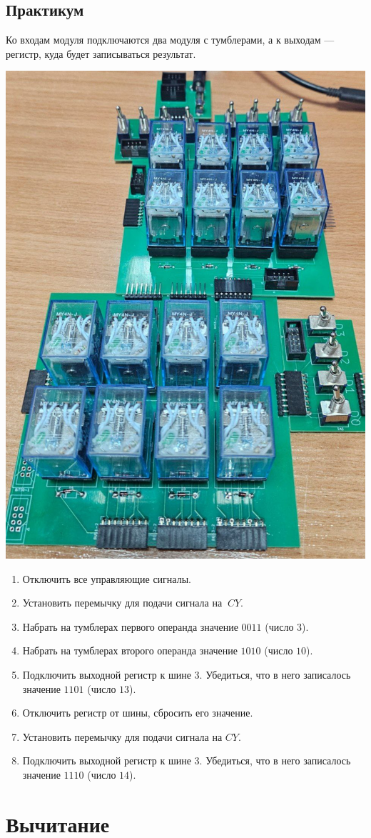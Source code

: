 \documentclass{book}
\begin{document}
\subsection{Практикум}

Ко входам модуля подключаются два модуля с тумблерами, а к выходам --- регистр,
куда будет записываться результат.

\includegraphics[width=0.5\columnwidth]{photo/adder.jpg}

\begin{enumerate}
    \item Отключить все управляющие сигналы.
    \item Установить перемычку для подачи сигнала на $~CY$.
    \item Набрать на тумблерах первого операнда значение $0011$ (число $3$).
    \item Набрать на тумблерах второго операнда значение $1010$ (число $10$).
    \item Подключить выходной регистр к шине $3$. Убедиться, что в него записалось значение $1101$ (число $13$).
    \item Отключить регистр от шины, сбросить его значение.
    \item Установить перемычку для подачи сигнала на $CY$.
    \item Подключить выходной регистр к шине $3$. Убедиться, что в него записалось значение $1110$ (число $14$).
\end{enumerate}


\section{Вычитание}
\end{document}
